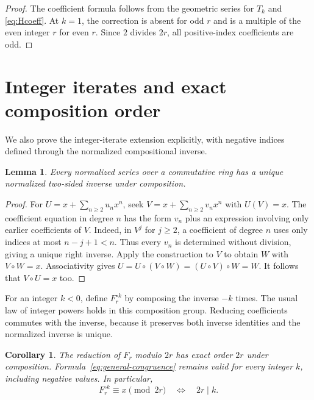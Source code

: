\documentclass[11pt,a4paper]{article}
\newtheorem{lemma}[theorem]{Lemma}
\newtheorem{corollary}[theorem]{Corollary}
\theoremstyle{remark}\newtheorem{remark}[theorem]{Remark}
\begin{document}
\begin{proof}
The coefficient formula follows from the geometric series for $T_k$
and \eqref{eq:Hcoeff}. At $k=1$, the correction is absent for odd
$r$ and is a multiple of the even integer $r$ for even $r$.
Since $2$ divides $2r$, all positive-index coefficients are odd.
\end{proof}

\section{Integer iterates and exact composition order}\label{sec:integer}

We also prove the integer-iterate extension explicitly, with negative
indices defined through the normalized compositional inverse.

\begin{lemma}\label{lem:inverse}
Every normalized series over a commutative ring has a unique
normalized two-sided inverse under composition.
\end{lemma}

\begin{proof}
For $U=x+\sum_{n\ge2}u_nx^n$, seek
$V=x+\sum_{n\ge2}v_nx^n$ with $U(V)=x$.
The coefficient equation in degree $n$ has the form $v_n$ plus
an expression involving only earlier coefficients of $V$.
Indeed, in $V^j$ for $j\ge2$, a coefficient of degree $n$ uses
only indices at most $n-j+1<n$. Thus every $v_n$ is determined
without division, giving a unique right inverse.
Apply the construction to $V$ to obtain $W$ with $V\circ W=x$.
Associativity gives
$U=U\circ(V\circ W)=(U\circ V)\circ W=W$.
It follows that $V\circ U=x$ too.
\end{proof}

For an integer $k<0$, define $F_r^{\circ k}$ by composing the inverse
$-k$ times. The usual law of integer powers holds in this composition
group. Reducing coefficients commutes with the inverse, because it
preserves both inverse identities and the normalized inverse is unique.

\begin{corollary}\label{cor:order}
The reduction of $F_r$ modulo $2r$ has exact order $2r$ under
composition. Formula~\eqref{eq:general-congruence} remains valid
for every integer $k$, including negative values. In particular,
\[
F_r^{\circ k}\equiv x\pmod{2r}
\quad\Longleftrightarrow\quad 2r\mid k.
\]
\end{corollary}
\end{document}
